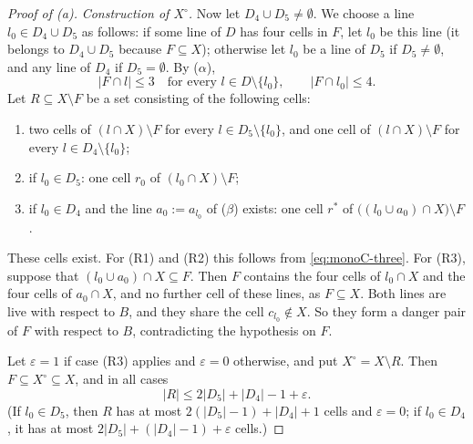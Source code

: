 \begin{proof}[Proof of \textup{(a)}]
\smallskip\noindent\emph{Construction of $X^\circ$.}
Now let $D_4\cup D_5\ne\emptyset$. We choose a line $l_0\in D_4\cup D_5$ as follows: if some line of $D$
has four cells in $F$, let $l_0$ be this line (it belongs to $D_4\cup D_5$ because $F\subseteq X$);
otherwise let $l_0$ be a line of $D_5$ if $D_5\ne\emptyset$, and any line of $D_4$ if $D_5=\emptyset$. By
($\alpha$),
\begin{equation}\label{eq:monoC-three}
  |F\cap l|\le 3\quad\text{for every } l\in D\setminus\{l_0\},\qquad |F\cap l_0|\le 4 .
\end{equation}
Let $R\subseteq X\setminus F$ be a set consisting of the following cells:
\begin{enumerate}[label=\textup{(R\arabic*)}]
\item two cells of $(l\cap X)\setminus F$ for every $l\in D_5\setminus\{l_0\}$, and one cell of
      $(l\cap X)\setminus F$ for every $l\in D_4\setminus\{l_0\}$;
\item if $l_0\in D_5$: one cell $r_0$ of $(l_0\cap X)\setminus F$;
\item if $l_0\in D_4$ and the line $a_0:=a_{l_0}$ of \textup{($\beta$)} exists: one cell $r^*$ of
      $\bigl((l_0\cup a_0)\cap X\bigr)\setminus F$.
\end{enumerate}
These cells exist. For (R1) and (R2) this follows from \eqref{eq:monoC-three}. For (R3), suppose that
$(l_0\cup a_0)\cap X\subseteq F$. Then $F$ contains the four cells of $l_0\cap X$ and the four cells of
$a_0\cap X$, and no further cell of these lines, as $F\subseteq X$. Both lines are live with respect to
$B$, and they share the cell $c_{l_0}\notin X$. So they form a danger pair of $F$ with respect to $B$,
contradicting the hypothesis on $F$.

Let $\varepsilon=1$ if case (R3) applies and $\varepsilon=0$ otherwise, and put $X^\circ=X\setminus R$. Then
$F\subseteq X^\circ\subseteq X$, and in all cases
\begin{equation}\label{eq:monoC-R}
  |R|\le 2|D_5|+|D_4|-1+\varepsilon .
\end{equation}
(If $l_0\in D_5$, then $R$ has at most $2(|D_5|-1)+|D_4|+1$ cells and $\varepsilon=0$; if $l_0\in D_4$, it
has at most $2|D_5|+(|D_4|-1)+\varepsilon$ cells.)


\end{proof}
